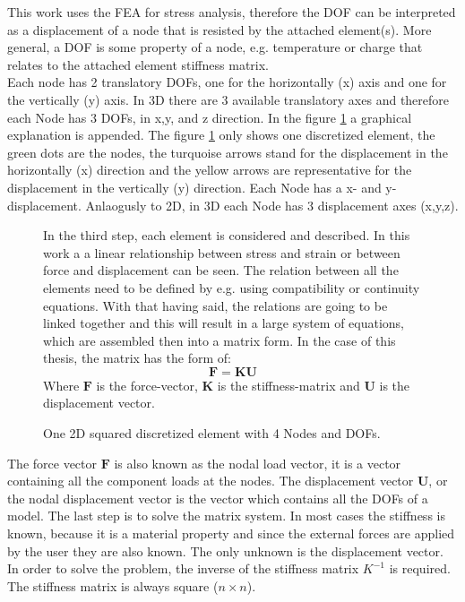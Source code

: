 This work uses the FEA for stress analysis, therefore the DOF can be interpreted as a displacement of a node that is resisted by the
attached element(s). More general, a DOF is some property of a node, e.g. temperature or charge that relates to the attached element stiffness matrix.\\

Each node has 2 translatory DOFs, one 
for the horizontally (x) axis and one for the vertically (y) axis.
 In 3D there are 3 available translatory 
 axes and therefore each Node has 3 DOFs, in x,y, and z direction. In the figure \ref{fig_2d_one_ele} a graphical explanation is appended. The figure \ref{fig_2d_one_ele} only shows one discretized element, the green dots are the nodes, the turquoise arrows stand for the displacement in the horizontally (x) direction and the yellow arrows are representative for the displacement in the vertically (y) direction. Each Node has a x- and y-displacement. Anlaogusly to 2D, in 3D each Node has 3 displacement axes (x,y,z).

\begin{figure} [!h]
\begin{minipage}{0.5\textwidth}
 \centering
 \def\svgwidth{\textwidth}
 
 \caption{One 2D squared discretized element with 4 Nodes and DOFs.} %
 \label{fig_2d_one_ele}   %
\end{minipage}
\hfill
\begin{minipage}{0.4\textwidth}
In the third step, each element is considered and described. In this work a
 a linear relationship between stress and strain or between force and displacement can be seen. The relation between all the elements need to be defined by e.g. using compatibility or continuity equations. With that having said, the relations are going to be linked together and this will result in a large system of equations, which are assembled then into a matrix form. In the case of this thesis, the matrix has the form of: 
$$\mathbf{F = KU}$$
Where $\textbf{F}$ is the force-vector, $\textbf{K}$ is the stiffness-matrix and $\textbf{U}$ is the displacement vector.\\
\end{minipage}
\end{figure} 

The force vector $\textbf{F}$ is also known as the nodal load vector, it is a vector containing all the component loads at the nodes. The displacement vector $\textbf{U}$, or the nodal displacement vector is the vector which contains all the DOFs of a model.
The last step is to solve the matrix system. In most cases the stiffness is known, because it is a material property and since the external forces are applied by the user they are also known.
The only unknown is the displacement vector. In order to solve the problem, the inverse of the stiffness matrix \textbf{$K^{-1}$} is required. The stiffness matrix is always square ($n \times n$).\\

